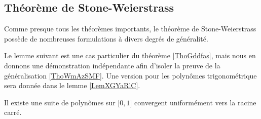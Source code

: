 \subsection{Théorème de Stone-Weierstrass}

Comme presque tous les théorèmes importants, le théorème de Stone-Weierstrass possède de nombreuses formulations à divers degrés de généralité.

Le lemme suivant est une cas particulier du théorème \ref{ThoGddfas}, mais nous en donnons une démonstration indépendante afin d'isoler la preuve de la généralisation \ref{ThoWmAzSMF}. Une version pour les polynômes trigonométrique sera donnée dans le lemme \ref{LemXGYaRlC}.

\begin{lemma}       \label{LemYdYLXb}
    Il existe une suite de polynômes sur \( \mathopen[ 0 , 1 \mathclose]\) convergent uniformément vers la racine carré.
\end{lemma}

